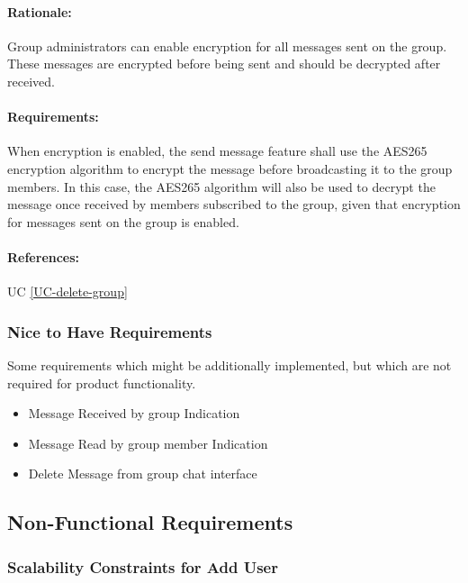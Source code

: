 \documentclass[11pt]{article}
\begin{document}
\paragraph{Rationale:} Group administrators can enable encryption for all messages sent on the group. These messages are encrypted before being sent and should be decrypted after received.
\paragraph{Requirements:} When encryption is enabled, the send message feature shall use the AES265 encryption algorithm to encrypt the message before broadcasting it to the group members. In this case, the AES265 algorithm will also be used to decrypt the message once received by members subscribed to the group, given that encryption for messages sent on the group is enabled.
\paragraph{References:} UC \ref{UC-delete-group}

\subsubsection{Nice to Have Requirements}	\label{FR-nice-to-have}
Some requirements which might be additionally implemented, but which are not required for product functionality.
\begin{itemize}
\item Message Received by group Indication
\item Message Read by group member Indication
\item Delete Message from group chat interface
\end{itemize}

\newpage
\subsection{Non-Functional Requirements}

\subsubsection{Scalability Constraints for Add User} \label{NFR-scalability-add-member}
\end{document}
